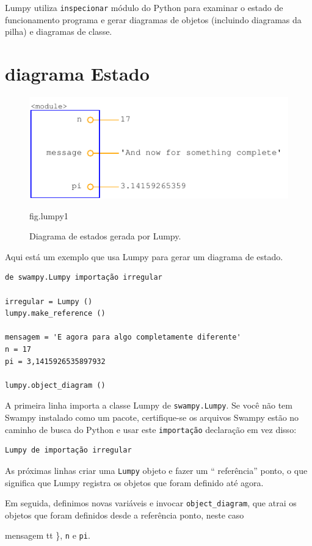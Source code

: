 \documentclass[10pt]{book}
\begin{document}
\begin{v erbatim}
Lumpy utiliza {\tt inspecionar} módulo do Python para examinar o estado de funcionamento
programa e gerar diagramas de objetos (incluindo diagramas da pilha) e
diagramas de classe.

\section{diagrama Estado}

\begin{figure}
\centerline
{\includegraphics[scale = 0.7] {figs/lumpydemo1.pdf}}
\caption{Diagrama de estados gerada por Lumpy.}
\label{} fig.lumpy1
\end{figure}

Aqui está um exemplo que usa Lumpy para gerar um diagrama de estado.
 

\begin{verbatim}
de swampy.Lumpy importação irregular

irregular = Lumpy ()
lumpy.make_reference ()

mensagem = 'E agora para algo completamente diferente'
n = 17
pi = 3,1415926535897932

lumpy.object_diagram ()
\end{verbatim}

A primeira linha importa a classe Lumpy de {\tt swampy.Lumpy}.
Se você não tem Swampy instalado como um pacote, certifique-se
os arquivos Swampy estão no caminho de busca do Python e usar este
{\tt importação} declaração em vez disso:

\begin{verbatim}
Lumpy de importação irregular
\end{verbatim}

As próximas linhas criar uma {\tt Lumpy} objeto e fazer um `` referência''
ponto, o que significa que Lumpy registra os objetos que foram
definido até agora.

Em seguida, definimos novas variáveis ​​e invocar \verb "object_diagram",
que atrai os objetos que foram definidos desde a referência
ponto, neste caso {mensagem tt \}, {\tt n} e {\tt pi}.

}
\end{v erbatim}
\end{document}
